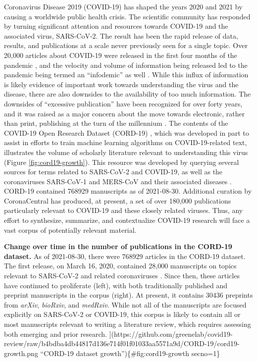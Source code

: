 \documentclass[twocolumn]{ceurart}
\begin{document}
Coronavirus Disease 2019 (COVID-19) has shaped the years 2020 and 2021 by causing a worldwide public health crisis.
The scientific community has responded by turning significant attention and resources towards COVID-19 and the associated virus, SARS-CoV-2.
The result has been the rapid release of data, results, and publications at a scale never previously seen for a single topic.
Over 20,000 articles about COVID-19 were released in the first four months of the pandemic \citep{7ub6VM4Z}, and the velocity and volume of information being released led to the pandemic being termed an ``infodemic'' as well \citep{7ub6VM4Z, nnfOazAC}.
While this influx of information is likely evidence of important work towards understanding the virus and the disease, there are also downsides to the availability of too much information.
The downsides of ``excessive publication'' have been recognized for over forty years, and it was raised as a major concern about the move towards electronic, rather than print, publishing at the turn of the millennium \citep{DfSr1Ohc}.
The contents of the COVID-19 Open Research Dataset (CORD-19) \citep{CiOwklc6}, which was developed in part to assist in efforts to train machine learning algorithms on COVID-19-related text, illustrates the volume of scholarly literature relevant to understanding this virus (Figure \ref{fig:cord19-growth}).
This resource was developed by querying several sources for terms related to SARS-CoV-2 and COVID-19, as well as the coronaviruses SARS-CoV-1 and MERS-CoV and their associated diseases \citep{CiOwklc6}.
CORD-19 contained 768929 manuscripts as of 2021-08-30.
Additional curation by CoronaCentral \citep{zQ1JIn2J} has produced, at present, a set of over 180,000 publications particularly relevant to COVID-19 and these closely related viruses.
Thus, any effort to synthesize, summarize, and contextualize COVID-19 research will face a vast corpus of potentially relevant material.

\textbf{Change over time in the number of publications in the CORD-19 dataset.}
As of 2021-08-30, there were 768929 articles in the CORD-19 dataset.
The first release, on March 16, 2020, contained 28,000 manuscripts on topics relevant to SARS-CoV-2 and related coronaviruses \citep{CiOwklc6}.
Since then, these articles have continued to proliferate (left), with both traditionally published and preprint manuscripts in the corpus (right).
At present, it contains 30436 preprints from \emph{arXiv}, \emph{bioRxiv}, and \emph{medRxiv}.
While not all of the manuscripts are focused explicitly on SARS-CoV-2 or COVID-19, this corpus is likely to contain all or most manuscripts relevant to writing a literature review, which requires assessing both emerging and prior research.
{]}(https://github.com/greenelab/covid19-review/raw/b4bdba4db44817d136e714f01f01033aa5571a9d/CORD-19/cord19-growth.png ``CORD-19 dataset growth'')\{\#fig:cord19-growth secno=1\}
\end{document}
